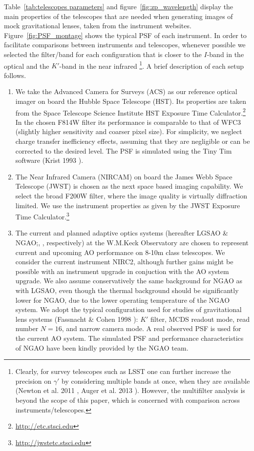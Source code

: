 \documentclass[a4paper,11pt]{article}
\begin{document}
{Table~\ref{tab:telescopes parameters} and
figure~\ref{fig:zp_wavelength} display the main properties of the
telescopes that are needed when generating images of mock
gravitational lenses, taken from the instrument
websites. Figure~\ref{fig:PSF_montage} shows the typical PSF of each
instrument. In order to facilitate comparisons between instruments and
telescopes, whenever possible we selected the filter/band for each
configuration that is closer to the $I$-band in the optical and the
$K'$-band in the near infrared \footnote{Clearly, for survey
telescopes such as LSST one can further increase the precision on
$\gamma'$ by considering multiple bands at once, when they are
available (Newton et al. 2011 \citep{2011ApJ...734..104N},
Auger et al. 2013 \citep{2013MNRAS.436..503A}). However, the
multifilter analysis is beyond the scope of this paper, which is
concerned with comparison across instruments/telescopes.}. A brief
description of each setup follows.

\begin{enumerate}

\item  We take the Advanced Camera for Surveys (ACS) as our reference
optical imager on board the Hubble Space Telescope (HST). Its
properties are taken from the Space Telescope Science Institute HST
Exposure Time Calculator.\footnote{\url{http://etc.stsci.edu}} In the
chosen F814W filter its performance is comparable to that of WFC3
(slightly higher sensitivity and coarser pixel size). For simplicity,
we neglect charge transfer inefficiency effects, assuming that they
are negligible or can be corrected to the desired level. The PSF is
simulated using the Tiny Tim software (Krist 1993
\cite{1993ASPC...52..536K}).


\item The Near Infrared Camera (NIRCAM) on board the James Webb Space
Telescope (JWST) is chosen as the next space based imaging capability.
We select the broad F200W filter, where the image quality is virtually
diffraction limited. We use the instrument properties as given by the
JWST Exposure Time Calculator.\footnote{\url{http://jwstetc.stsci.edu}}

\item The current and planned adaptive optics systems (hereafter LGSAO \&
NGAO;\citep{2006PASP..118..297W}, \citep{2010SPIE.7736E..0KW},
respectively) at the W.M.Keck Observatory are chosen to represent
current and upcoming AO performance on 8-10m class telescopes. We
consider the current instrument NIRC2, although further gains might be
possible with an instrument upgrade in conjuction with the AO system
upgrade. We also assume conservatively the same background for NGAO as
with LGSAO, even though the thermal background should be significantly
lower for NGAO, due to the lower operating temperature of the NGAO
system. We adopt the typical configuration used for studies of
gravitational lens systems (Fassnacht \& Cohen 1998
\citep{1998AJ....115..377F}): $K'$ filter, MCDS readout mode, read
number $N=16$, and narrow camera mode. A real observed PSF is used for
the current AO system. The simulated PSF and performance
characteristics of NGAO have been kindly provided by the NGAO team.


\end{enumerate}}
\end{document}
